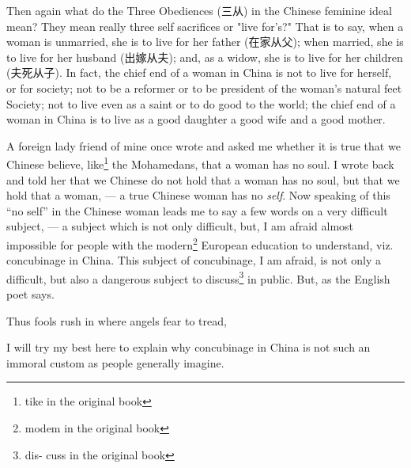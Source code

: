 Then again what do the Three Obediences (三从) in the Chinese feminine ideal mean?
They mean really three self sacrifices or "live for's?"
That is to say, when a woman is unmarried, she is to live for her father (在家从父); when married, she is to live for her husband (出嫁从夫); and, as a widow, she is to live for her children (夫死从子).
In fact, the chief end of a woman in China is not to live for herself, or for society; not to be a reformer or to be president of the woman's natural feet Society; not to live even as a saint or to do good to the world; the chief end of a woman in China is to live as a good daughter a good wife and a good mother.

A foreign lady friend of mine once wrote and asked me whether it is true that we Chinese believe, like\footnote{tike in the original book} the Mohamedans, that a woman has no soul.
I wrote back and told her that we Chinese do not hold that a woman has no soul, but that we hold that a woman, --- a true Chinese woman has no \emph{self}.
Now speaking of this ``no self'' in the Chinese woman leads me to say a few words on a very difficult subject, --- a subject which is not only difficult, but, I am afraid almost impossible for people with the modern\footnote{modem in the original book} European education to understand, viz. concubinage in China.
This subject of concubinage, I am afraid, is not only a difficult, but also a dangerous subject to discuss\footnote{dis- cuss in the original book} in public.
But, as the English poet says.
\begin{center}
     Thus fools rush in where angels fear to tread,
 \end{center}

I will try my best here to explain why concubinage in China is not such an immoral custom as people generally imagine.

